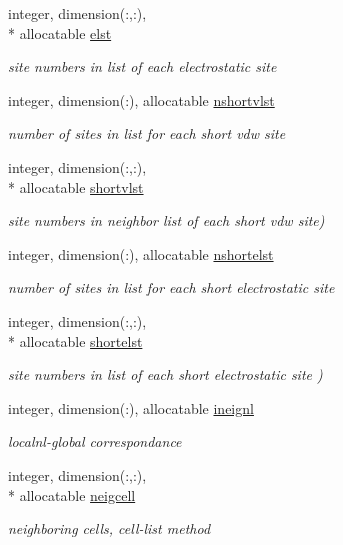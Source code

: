 \begin{DoxyCompactItemize}
integer, dimension(\-:,\-:), \\*
allocatable \hyperlink{classneigh_ab05aa2b85614fd0d577bedd72c64317f}{elst}
\begin{DoxyCompactList}\small\item\em site numbers in list of each electrostatic site \end{DoxyCompactList}\item 
integer, dimension(\-:), allocatable \hyperlink{classneigh_a3d0ef9d60a1a7083ee02308853aa164b}{nshortvlst}
\begin{DoxyCompactList}\small\item\em number of sites in list for each short vdw site \end{DoxyCompactList}\item 
integer, dimension(\-:,\-:), \\*
allocatable \hyperlink{classneigh_ab62999202e9b876b405ddc2463ed38bc}{shortvlst}
\begin{DoxyCompactList}\small\item\em site numbers in neighbor list of each short vdw site) \end{DoxyCompactList}\item 
integer, dimension(\-:), allocatable \hyperlink{classneigh_a1a4c1aa7767a563fd0c9566eefccd545}{nshortelst}
\begin{DoxyCompactList}\small\item\em number of sites in list for each short electrostatic site \end{DoxyCompactList}\item 
integer, dimension(\-:,\-:), \\*
allocatable \hyperlink{classneigh_a24094fcb31131c89f6818c5667e6252f}{shortelst}
\begin{DoxyCompactList}\small\item\em site numbers in list of each short electrostatic site ) \end{DoxyCompactList}\item 
integer, dimension(\-:), allocatable \hyperlink{classneigh_aea3521da43e6d88ae7b00dba06240210}{ineignl}
\begin{DoxyCompactList}\small\item\em localnl-\/global correspondance \end{DoxyCompactList}\item 
integer, dimension(\-:,\-:), \\*
allocatable \hyperlink{classneigh_ae3aefdb55a54810d0a4c7d9001957752}{neigcell}
\begin{DoxyCompactList}\small\item\em neighboring cells, cell-\/list method \end{DoxyCompactList}\item 

\end{DoxyCompactItemize}
